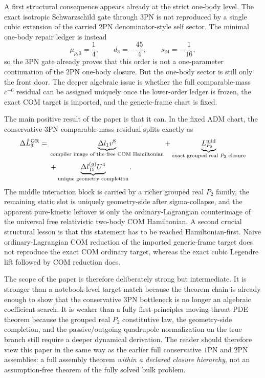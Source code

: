 \documentclass[11pt]{article}
\begin{document}
A first structural consequence appears already at the strict one-body level.
The exact isotropic Schwarzschild gate through $3$PN is not reproduced by a
single cubic extension of the carried $2$PN denominator-style self sector.  The
minimal one-body repair ledger is instead
\[
\mu_{\rho,3}=\frac14,
\qquad
 d_3=-\frac{45}{4},
\qquad
 s_{24}=-\frac1{16},
\]
so the $3$PN gate already proves that this order is not a one-parameter
continuation of the $2$PN one-body closure.  But the one-body sector is still
only the front door.  The deeper algebraic issue is whether the full
comparable-mass $c^{-6}$ residual can be assigned uniquely once the lower-order
ledger is frozen, the exact COM target is imported, and the generic-frame chart
is fixed.

The main positive result of the paper is that it can.  In the fixed ADM chart,
the conservative $3$PN comparable-mass residual splits exactly as
\[
\begin{aligned}
\Delta \hat L_3^{\rm GR}
=\;&\underbrace{\Delta l_1 v^8}_{\text{compiler image of the free COM Hamiltonian}}
+\underbrace{L_{P_2}^{\rm mid}}_{\text{exact grouped real }P_2\text{ closure}}
\\
&+\underbrace{\Delta l_{15}^{(g)}U^4}_{\text{unique geometry completion}}.
\end{aligned}
\]
The middle interaction block is carried by a richer grouped real $P_2$ family,
the remaining static slot is uniquely geometry-side after sigma-collapse, and
the apparent pure-kinetic leftover is only the ordinary-Lagrangian counterimage
of the universal free relativistic two-body COM Hamiltonian.  A second crucial
structural lesson is that this statement has to be reached Hamiltonian-first.
Naive ordinary-Lagrangian COM reduction of the imported generic-frame target does
not reproduce the exact COM ordinary target, whereas the exact cubic Legendre
lift followed by COM reduction does.

The scope of the paper is therefore deliberately strong but intermediate.  It is
stronger than a notebook-level target match because the theorem chain is already
enough to show that the conservative $3$PN bottleneck is no longer an algebraic
coefficient search.  It is weaker than a fully first-principles moving-throat
PDE theorem because the grouped real $P_2$ constitutive law, the geometry-side
completion, and the passive/outgoing quadrupole normalization on the true branch
still require a deeper dynamical derivation.  The reader should therefore view
this paper in the same way as the earlier full conservative $1$PN and $2$PN
assemblies: a full assembly theorem \emph{within a declared closure hierarchy},
not an assumption-free theorem of the fully solved bulk problem.
\end{document}
